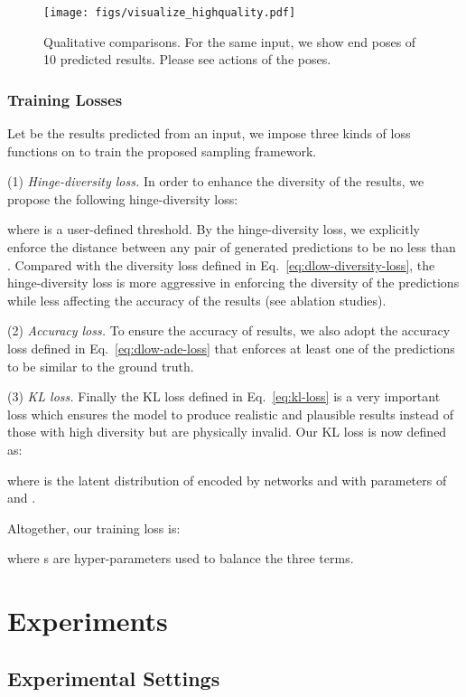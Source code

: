 \documentclass[sigconf,screen,nonacm]{acmart}
\begin{document}
	
\begin{figure*}[!t]
		\centering
		\texttt{[image: figs/visualize\_highquality.pdf]}
		\caption{Qualitative comparisons. For the same input, we show end poses of 10 predicted results. Please see actions of the poses.}
		\label{fig:quality_visualize}
	\end{figure*}
	
	\subsubsection{Training Losses} 
	Let  be the  results predicted from an input, we impose three kinds of loss functions on  to train the proposed sampling framework.


	(1) \textit{Hinge-diversity loss.} In order to enhance the diversity of the results, we propose the following hinge-diversity loss:
	
	where  is a user-defined threshold. By the hinge-diversity loss, we explicitly enforce the distance between any pair of generated predictions to be no less than . Compared with the diversity loss defined in Eq.~\ref{eq:dlow-diversity-loss}, the hinge-diversity loss is more aggressive in enforcing the diversity of the predictions while less affecting the accuracy of the results (see ablation studies).
	
	(2) \textit{Accuracy loss.} To ensure the accuracy of results, we also adopt the accuracy loss  defined in Eq.~\ref{eq:dlow-ade-loss} that enforces at least one of the predictions to be similar to the ground truth. 
	
	(3) \textit{KL loss.} Finally the KL loss defined in Eq.~\ref{eq:kl-loss} is a very important loss which ensures the model to produce realistic and plausible results instead of those with high diversity but are physically invalid. Our KL loss is now defined as:
	
	where  is the latent distribution of  encoded by networks  and  with parameters of  and . 
	
	Altogether, our training loss is:
	
	where s are hyper-parameters used to balance the three terms.
	
	\section{Experiments}




	\subsection{Experimental Settings}
	
\end{document}
